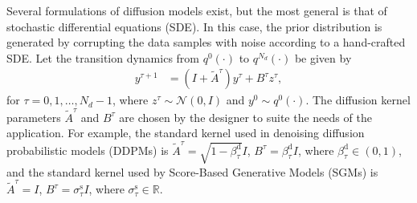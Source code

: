 \documentclass[letterpaper, 10 pt, conference]{IEEEconf}
\renewcommand{\Re}{\mathbb{R}}
\begin{document}
Several formulations of diffusion models exist, but the most general is that of stochastic differential equations (SDE).
In this case, the prior distribution is generated by corrupting the data samples with noise according to a hand-crafted SDE.
Let the transition dynamics from $q^{0}(\cdot)$ to $q^{N_d}(\cdot)$ be given by
\begin{align} \label{eq:discrete_forward_sde}
    y^{\tau+1} &= (I + \tilde{A}^{\tau}) y^{\tau} + B^{\tau} z^{\tau},
\end{align}
for $\tau = 0, 1, \dots, N_{d}-1$,
where $z^{\tau} \sim \mathcal{N}(0, I)$ 
and $y^{0} \sim q^{0}(\cdot)$.
The diffusion kernel parameters $\tilde{A}^{\tau}$ and $B^{\tau}$ are chosen by the designer to suite the needs of the application.
For example, the standard kernel used in denoising diffusion probabilistic models (DDPMs) is $\tilde{A}^{\tau} = \sqrt{1 - \beta_{\tau}^\mathrm{d}} I$, $B^{\tau} = \beta_{\tau}^{\mathrm{d}} I$, where $\beta_{\tau}^{\mathrm{d}} \in (0, 1)$, and the standard kernel used by Score-Based Generative Models (SGMs) is $\tilde{A}^{\tau} = I$, $B^{\tau} = \sigma_{\tau}^\mathrm{s} I$, where $\sigma_{\tau}^\mathrm{s} \in \Re$.
\end{document}

